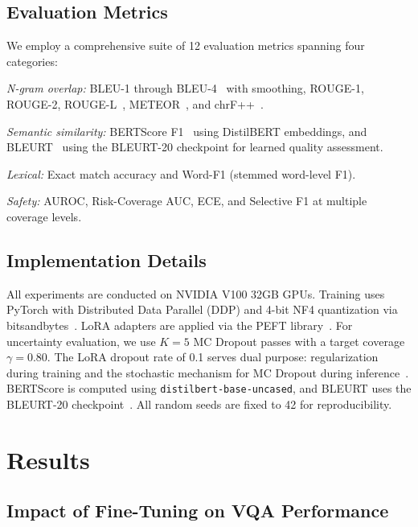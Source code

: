 \documentclass[pdflatex,sn-mathphys-num]{sn-jnl}
\begin{document}
\subsection{Evaluation Metrics}

We employ a comprehensive suite of 12 evaluation metrics spanning four categories:

\textit{N-gram overlap:} BLEU-1 through BLEU-4~\cite{papineni2002bleu} with smoothing, ROUGE-1, ROUGE-2, ROUGE-L~\cite{lin2004rouge}, METEOR~\cite{banerjee2005meteor}, and chrF++~\cite{popovic2015chrf}.

\textit{Semantic similarity:} BERTScore F1~\cite{zhang2020bertscore} using DistilBERT embeddings, and BLEURT~\cite{sellam2020bleurt} using the BLEURT-20 checkpoint for learned quality assessment.

\textit{Lexical:} Exact match accuracy and Word-F1 (stemmed word-level F1).

\textit{Safety:} AUROC, Risk-Coverage AUC, ECE, and Selective F1 at multiple coverage levels.

\subsection{Implementation Details}

All experiments are conducted on NVIDIA V100 32GB GPUs. Training uses PyTorch with Distributed Data Parallel (DDP) and 4-bit NF4 quantization via bitsandbytes~\cite{dettmers2024qlora}. LoRA adapters are applied via the PEFT library~\cite{peft2023}. For uncertainty evaluation, we use $K = 5$ MC Dropout passes with a target coverage $\gamma = 0.80$. The LoRA dropout rate of 0.1 serves dual purpose: regularization during training and the stochastic mechanism for MC Dropout during inference~\cite{gal2016dropout}. BERTScore is computed using \texttt{distilbert-base-uncased}, and BLEURT uses the BLEURT-20 checkpoint~\cite{sellam2020bleurt}. All random seeds are fixed to 42 for reproducibility.

\section{Results}\label{sec:results}

\subsection{Impact of Fine-Tuning on VQA Performance}
\end{document}
